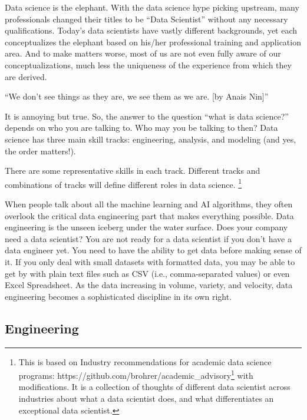 \documentclass[12pt,]{krantz}
\renewenvironment{quote}{\begin{VF}}{\end{VF}}
\renewcommand{\href}[2]{#2\footnote{\url{#1}}}
\begin{document}
Data science is the elephant. With the data science hype picking upstream, many professionals changed their titles to be ``Data Scientist'' without any necessary qualifications. Today's data scientists have vastly different backgrounds, yet each conceptualizes the elephant based on his/her professional training and application area. And to make matters worse, most of us are not even fully aware of our conceptualizations, much less the uniqueness of the experience from which they are derived.

\begin{quote}
``We don't see things as they are, we see them as we are. {[}by Anais Nin{]}''
\end{quote}

It is annoying but true. So, the answer to the question ``what is data science?'' depends on who you are talking to. Who may you be talking to then? Data science has three main skill tracks: engineering, analysis, and modeling (and yes, the order matters!).

There are some representative skills in each track. Different tracks and combinations of tracks will define different roles in data science. \footnote{This is based on \href{https://github.com/brohrer/academic_advisory}{Industry recommendations for academic data science programs: https://github.com/brohrer/academic\_advisory} with modifications. It is a collection of thoughts of different data scientist across industries about what a data scientist does, and what differentiates an exceptional data scientist.}

When people talk about all the machine learning and AI algorithms, they often overlook the critical data engineering part that makes everything possible. Data engineering is the unseen iceberg under the water surface. Does your company need a data scientist? You are not ready for a data scientist if you don't have a data engineer yet. You need to have the ability to get data before making sense of it. If you only deal with small datasets with formatted data, you may be able to get by with plain text files such as CSV (i.e., comma-separated values) or even Excel Spreadsheet. As the data increasing in volume, variety, and velocity, data engineering becomes a sophisticated discipline in its own right.

\hypertarget{engineering}{%
\subsection{Engineering}\label{engineering}}
\end{document}

